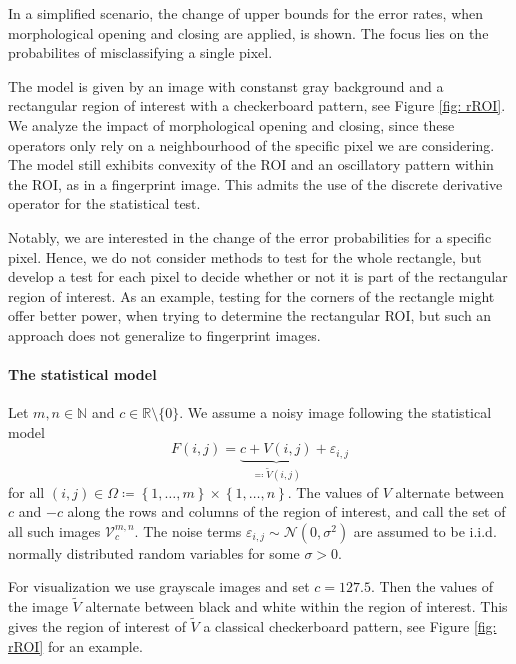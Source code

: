\documentclass[a4paper,12pt]{article}
\theoremstyle{plain}
\theoremstyle{definition}
\begin{document}
In a simplified scenario, the change of upper bounds for the error rates, when morphological opening and closing are applied, is shown. The focus lies on the probabilites of misclassifying a single pixel.

The model is given by an image with constanst gray background and a rectangular region of interest with a checkerboard pattern, see Figure \ref{fig: rROI}. We analyze the impact of morphological opening and closing, since these operators only rely on a neighbourhood of the specific pixel we are considering. The model still exhibits convexity of the ROI and an oscillatory pattern within the ROI, as in a fingerprint image. This admits the use of the discrete derivative operator for the statistical test.

Notably, we are interested in the change of the error probabilities for a specific pixel. Hence, we do not consider methods to test for the whole rectangle, but develop a test for each pixel to decide whether or not it is part of the rectangular region of interest. As an example, testing for the corners of the rectangle might offer better power, when trying to determine the rectangular ROI, but such an approach does not generalize to fingerprint images.



\paragraph{The statistical model}

Let $m, n \in \mathbb{N}$ and $c \in \mathbb{R} \setminus \{ 0 \}$. We assume a noisy image following the statistical model
\begin{equation}\label{statmodel}
	F(i, j) = \underbrace{c + V(i, j)}_{\eqqcolon \tilde{V}(i, j)} + \varepsilon_{i, j}
\end{equation}
for all $(i, j) \in \Omega \coloneqq \left\{ 1, \dots, m \right\} \times \left\{ 1, \dots, n \right\}$. The values of $V$ alternate between $c$ and $-c$ along the rows and columns of the region of interest, and call the set of all such images $\mathcal{V}_c^{m, n}$. The noise terms $\varepsilon_{i, j} \sim \mathcal{N}(0, \sigma^2)$ are assumed to be i.i.d. normally distributed random variables for some $\sigma > 0$.

For visualization we use grayscale images and set $c = 127.5$. Then the values of the image $\tilde{V}$ alternate between black and white within the region of interest. This gives the region of interest of $\tilde{V}$ a classical checkerboard pattern, see Figure \ref{fig: rROI} for an example.
\end{document}
